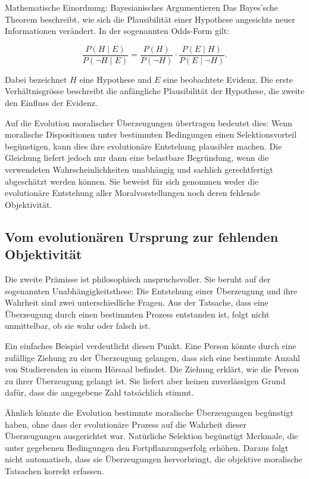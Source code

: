 \documentclass[a4paper,11pt]{article}
\begin{document}
	\begin{mathbox}{Mathematische Einordnung: Bayesianisches Argumentieren}
		Das Bayes'sche Theorem beschreibt, wie sich die Plausibilität
		einer Hypothese angesichts neuer Informationen verändert. In
		der sogenannten Odds-Form gilt:
		
		\[
		\frac{P(H\mid E)}{P(\neg H\mid E)}
		=
		\frac{P(H)}{P(\neg H)}
		\cdot
		\frac{P(E\mid H)}{P(E\mid\neg H)}.
		\]
		
		Dabei bezeichnet \(H\) eine Hypothese und \(E\) eine beobachtete
		Evidenz. Die erste Verhältnisgrösse beschreibt die anfängliche
		Plausibilität der Hypothese, die zweite den Einfluss der Evidenz.
		
		Auf die Evolution moralischer Überzeugungen übertragen bedeutet
		dies: Wenn moralische Dispositionen unter bestimmten Bedingungen
		einen Selektionsvorteil begünstigen, kann dies ihre evolutionäre
		Entstehung plausibler machen. Die Gleichung liefert jedoch nur
		dann eine belastbare Begründung, wenn die verwendeten
		Wahrscheinlichkeiten unabhängig und sachlich gerechtfertigt
		abgeschätzt werden können. Sie beweist für sich genommen weder
		die evolutionäre Entstehung aller Moralvorstellungen noch deren
		fehlende Objektivität.
	\end{mathbox}
	
	\subsection{Vom evolutionären Ursprung zur fehlenden Objektivität}
	
	Die zweite Prämisse ist philosophisch anspruchsvoller. Sie beruht
	auf der sogenannten Unabhängigkeitsthese: Die Entstehung einer
	Überzeugung und ihre Wahrheit sind zwei unterschiedliche Fragen.
	Aus der Tatsache, dass eine Überzeugung durch einen bestimmten
	Prozess entstanden ist, folgt nicht unmittelbar, ob sie wahr oder
	falsch ist.
	
	Ein einfaches Beispiel verdeutlicht diesen Punkt. Eine Person
	könnte durch eine zufällige Ziehung zu der Überzeugung gelangen,
	dass sich eine bestimmte Anzahl von Studierenden in einem
	Hörsaal befindet. Die Ziehung erklärt, wie die Person zu ihrer
	Überzeugung gelangt ist. Sie liefert aber keinen zuverlässigen
	Grund dafür, dass die angegebene Zahl tatsächlich stimmt.
	
	Ähnlich könnte die Evolution bestimmte moralische Überzeugungen
	begünstigt haben, ohne dass der evolutionäre Prozess auf die
	Wahrheit dieser Überzeugungen ausgerichtet war. Natürliche
	Selektion begünstigt Merkmale, die unter gegebenen Bedingungen
	den Fortpflanzungserfolg erhöhen. Daraus folgt nicht automatisch,
	dass sie Überzeugungen hervorbringt, die objektive moralische
	Tatsachen korrekt erfassen.
	
\end{document}
